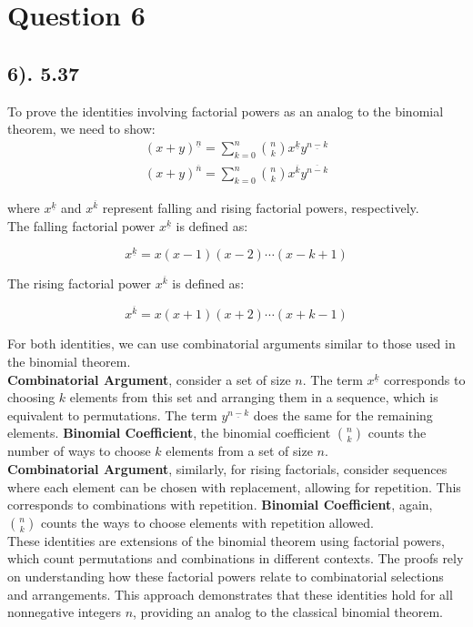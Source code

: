 \documentclass[12pt]{article}
\begin{document}
\section*{Question 6}
\subsection*{6). 5.37}
To prove the identities involving factorial powers as an analog to the binomial theorem, we need to show:
\begin{gather*}
(x + y)^{\underline{n}} = \sum_{k=0}^{n} \binom{n}{k} x^{\underline{k}} y^{\underline{n-k}} \\
(x + y)^{\overline{n}} = \sum_{k=0}^{n} \binom{n}{k} x^{\overline{k}} y^{\overline{n-k}}
\end{gather*}

where \(x^{\underline{k}}\) and \(x^{\overline{k}}\) represent falling and rising factorial powers, respectively. \\

The falling factorial power \(x^{\underline{k}}\) is defined as:

\[ x^{\underline{k}} = x (x - 1) (x - 2) \cdots (x - k + 1) \]

The rising factorial power \(x^{\overline{k}}\) is defined as:

\[ x^{\overline{k}} = x (x + 1) (x + 2) \cdots (x + k - 1) \]

For both identities, we can use combinatorial arguments similar to those used in the binomial theorem. \\

\textbf{Combinatorial Argument}, consider a set of size \(n\). The term \(x^{\underline{k}}\) corresponds to choosing \(k\) elements from this set and arranging them in a sequence, which is equivalent to permutations.
The term \(y^{\underline{n-k}}\) does the same for the remaining elements.
\textbf{Binomial Coefficient}, the binomial coefficient \(\binom{n}{k}\) counts the number of ways to choose \(k\) elements from a set of size \(n\). \\

\textbf{Combinatorial Argument}, similarly, for rising factorials, consider sequences where each element can be chosen with replacement, allowing for repetition. This corresponds to combinations with repetition.
\textbf{Binomial Coefficient}, again, \(\binom{n}{k}\) counts the ways to choose elements with repetition allowed. \\

These identities are extensions of the binomial theorem using factorial powers, which count permutations and combinations in different contexts. The proofs rely on understanding how these factorial powers relate to combinatorial selections and arrangements.
This approach demonstrates that these identities hold for all nonnegative integers \(n\), providing an analog to the classical binomial theorem.
\end{document}
